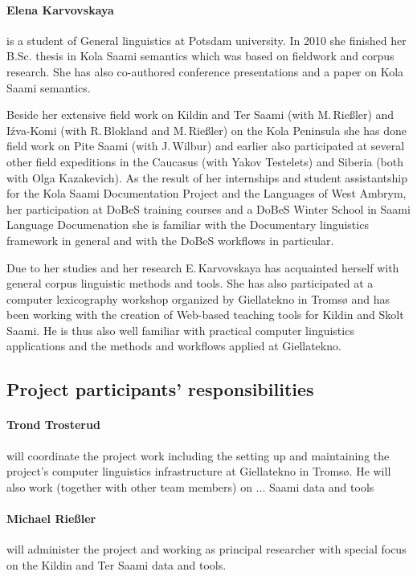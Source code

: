 \documentclass[a4paper,12pt]{article}
\begin{document}
\paragraph{Elena Karvovskaya} is a student of General linguistics at Potsdam university. In 2010 she finished her B.Sc. thesis in Kola Saami semantics which was based on fieldwork and corpus research. She has also co-authored conference presentations and a paper on Kola Saami semantics.

Beside her extensive field work on Kildin and Ter Saami (with M.\,Rießler) and Iźva-Komi (with R.\,Blokland and M.\,Rießler) on the Kola Peninsula she has done field work on Pite Saami (with J.\,Wilbur) and earlier also participated at several other field expeditions in the Caucasus (with Yakov Testelets) and Siberia (both with Olga Kazakevich). As the result of her internships and student assistantship for the Kola Saami Documentation Project and the Languages of West Ambrym, her participation at DoBeS training courses and a DoBeS Winter School in Saami Language Documenation she is familiar with the Documentary linguistics framework in general and with the DoBeS workflows in particular.

Due to her studies and her research E.\,Karvovskaya has acquainted herself with general corpus linguistic methods and tools. She has also participated at a computer lexicography workshop organized by Giellatekno in Tromsø and has been working with the creation of Web-based teaching tools for Kildin and Skolt Saami. He is thus also well familiar with practical computer linguistics applications and the methods and workflows applied at Giellatekno.

\subsection{Project participants' responsibilities}

\paragraph{Trond Trosterud} will coordinate the project work including the setting up and maintaining the project's computer linguistics infrastructure at Giellatekno in Tromsø. He will also work (together with other team members) on ... Saami data and tools%

\paragraph{Michael Rießler} will administer the project and working as principal researcher with special focus on the Kildin and Ter Saami data and tools.%
\end{document}

